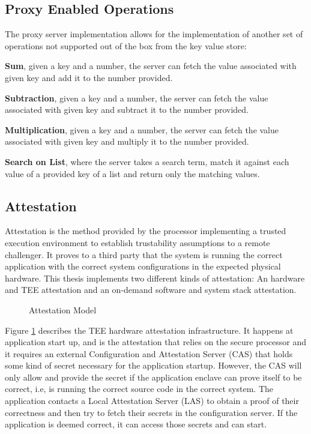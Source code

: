 \subsection{Proxy Enabled Operations}
\label{ssec:proxy_enabled_operations}

The proxy server implementation allows for the implementation of another set of operations not supported out of the box from the key value store:

\textbf{Sum}, given a key and a number, the server can fetch the value associated with given key and add it to the number provided.

\textbf{Subtraction}, given a key and a number, the server can fetch the value associated with given key and subtract it to the number provided.

\textbf{Multiplication}, given a key and a number, the server can fetch the value associated with given key and multiply it to the number provided.

\textbf{Search on List}, where the server takes a search term, match it against each value of a provided key of a list and return only the matching values.

\subsection{Attestation}
\label{ssec:attestation_system_model}

Attestation is the method provided by the processor implementing a trusted execution environment to establish trustability assumptions to a remote challenger. It proves to a third party that the system is running the correct application with the correct system configurations in the expected physical hardware. This thesis implements two different kinds of attestation: An hardware and \gls{TEE} attestation and an on-demand software and system stack attestation.

\begin{figure}[htbp]
  \caption{Attestation Model}
  \label{fig:attestation_model}
\end{figure}

Figure \ref{fig:attestation_model} describes the \gls{TEE} hardware attestation infrastructure. It happens at application start up, and is the attestation that relies on the secure processor and it requires an external Configuration and Attestation Server (\gls{CAS}) that holds some kind of secret necessary for the application startup. However, the \gls{CAS} will only allow and provide the secret if the application enclave can prove itself to be correct, i.e, is running the correct source code in the correct system. The application contacts a Local Attestation Server (\gls{LAS}) to obtain a proof of their correctness and then try to fetch their secrets in the configuration server. If the application is deemed correct, it can access those secrets and can start.

